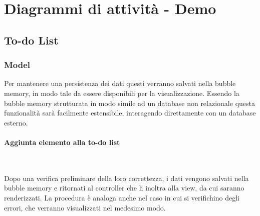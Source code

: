 \section{Diagrammi di attività - Demo}

\subsection{To-do List}

\subsubsection{Model}
Per mantenere una persistenza dei dati questi verranno salvati nella bubble memory, in modo tale da essere disponibili per la visualizzazione. Essendo la bubble memory strutturata in modo simile ad un database non relazionale questa funzionalità sarà facilmente estensibile, interagendo direttamente con un database esterno.

\begin{samepage}
\paragraph{Aggiunta elemento alla to-do list}\mbox{}\\
\end{samepage}
Dopo una verifica preliminare della loro correttezza, i dati vengono salvati nella bubble memory e ritornati al controller che li inoltra alla view, da cui saranno renderizzati.
La procedura è analoga anche nel caso in cui si verifichino degli errori, che verranno visualizzati nel medesimo modo.


